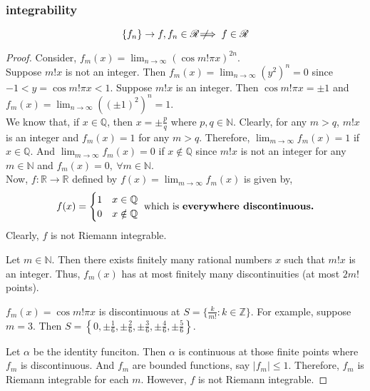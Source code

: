 \subsubsection{integrability} 
\[ \{f_n\} \to f, f_n \in \mathscr{R} \not\!\!\!\implies f \in \mathscr{R} \]
\begin{proof}
Consider, $\displaystyle f_m(x) = \lim_{n \to \infty} (\cos m!\pi x)^{2n}$.\\

Suppose $m!x$ is not an integer.
Then $\displaystyle f_m(x) = \lim_{n \to \infty} (y^2)^n = 0$ since $-1<y = \cos m! \pi x <1$.
Suppose $m!x$ is an integer.
Then $\cos m! \pi x = \pm 1$ and $\displaystyle f_m(x) = \lim_{n \to \infty} ((\pm 1)^2)^n = 1$.\\

We know that, if $x \in \mathbb{Q}$, then $x = \pm \frac{p}{q}$ where $p,q \in \mathbb{N}$.
Clearly, for any $m > q$, $m! x$ is an integer and $f_m(x) =1 $ for any $m > q$.
Therefore, $\displaystyle \lim_{m \to \infty} f_m(x) = 1$ if $x \in \mathbb{Q}$.
And $\displaystyle \lim_{m \to \infty} f_m(x) = 0$ if $x \notin \mathbb{Q}$ since $m! x$ is not an integer for any $m \in \mathbb{N}$ and $f_m(x) = 0,\ \forall m \in \mathbb{N}$.\\

Now, $f : \mathbb{R} \to \mathbb{R}$ defined by $\displaystyle f(x) = \lim_{m \to \infty} f_m(x)$ is given by,
	\[ f(x) = \begin{cases} 1 & x \in \mathbb{Q} \\ 0 & x \notin \mathbb{Q} \end{cases} \text{ which is \textbf{everywhere discontinuous.}} \]
Clearly, $f$ is not Riemann integrable.\\

\begin{important}
Let $m \in \mathbb{N}$.
Then there exists finitely many rational numbers $x$ such that $m!x$ is an integer.
Thus, $f_m(x)$ has at most finitely many discontinuities  (at most $2m!$ points).
\end{important}
\begin{commentary}
$f_m(x) = \cos m! \pi x$ is discontinuous at $S = \{ \frac{k}{m!} : k \in \mathbb{Z} \}$.
For example, suppose $m = 3$.
Then $S = \left\{ 0,\pm\frac{1}{6},\pm\frac{2}{6},\pm\frac{3}{6},\pm\frac{4}{6},\pm\frac{5}{6} \right\}$.
\end{commentary}
Let $\alpha$ be the identity funciton.
Then $\alpha$ is continuous at those finite points where $f_m$ is discontinuous.
And $f_m$ are bounded functions, say $|f_m| \le 1$.
Therefore, $f_m$ is Riemann integrable for each $m$.
However, $f$ is not Riemann integrable.
\end{proof}
